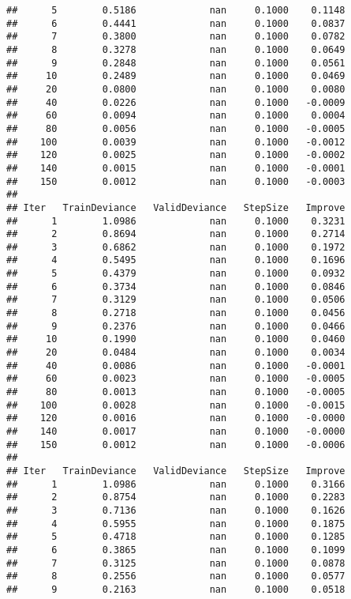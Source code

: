 \documentclass[
]{article}
\begin{document}
\begin{verbatim}
##      5        0.5186             nan     0.1000    0.1148
##      6        0.4441             nan     0.1000    0.0837
##      7        0.3800             nan     0.1000    0.0782
##      8        0.3278             nan     0.1000    0.0649
##      9        0.2848             nan     0.1000    0.0561
##     10        0.2489             nan     0.1000    0.0469
##     20        0.0800             nan     0.1000    0.0080
##     40        0.0226             nan     0.1000   -0.0009
##     60        0.0094             nan     0.1000    0.0004
##     80        0.0056             nan     0.1000   -0.0005
##    100        0.0039             nan     0.1000   -0.0012
##    120        0.0025             nan     0.1000   -0.0002
##    140        0.0015             nan     0.1000   -0.0001
##    150        0.0012             nan     0.1000   -0.0003
## 
## Iter   TrainDeviance   ValidDeviance   StepSize   Improve
##      1        1.0986             nan     0.1000    0.3231
##      2        0.8694             nan     0.1000    0.2714
##      3        0.6862             nan     0.1000    0.1972
##      4        0.5495             nan     0.1000    0.1696
##      5        0.4379             nan     0.1000    0.0932
##      6        0.3734             nan     0.1000    0.0846
##      7        0.3129             nan     0.1000    0.0506
##      8        0.2718             nan     0.1000    0.0456
##      9        0.2376             nan     0.1000    0.0466
##     10        0.1990             nan     0.1000    0.0460
##     20        0.0484             nan     0.1000    0.0034
##     40        0.0086             nan     0.1000   -0.0001
##     60        0.0023             nan     0.1000   -0.0005
##     80        0.0013             nan     0.1000   -0.0005
##    100        0.0028             nan     0.1000   -0.0015
##    120        0.0016             nan     0.1000   -0.0000
##    140        0.0017             nan     0.1000   -0.0000
##    150        0.0012             nan     0.1000   -0.0006
## 
## Iter   TrainDeviance   ValidDeviance   StepSize   Improve
##      1        1.0986             nan     0.1000    0.3166
##      2        0.8754             nan     0.1000    0.2283
##      3        0.7136             nan     0.1000    0.1626
##      4        0.5955             nan     0.1000    0.1875
##      5        0.4718             nan     0.1000    0.1285
##      6        0.3865             nan     0.1000    0.1099
##      7        0.3125             nan     0.1000    0.0878
##      8        0.2556             nan     0.1000    0.0577
##      9        0.2163             nan     0.1000    0.0518

\end{verbatim}
\end{document}
